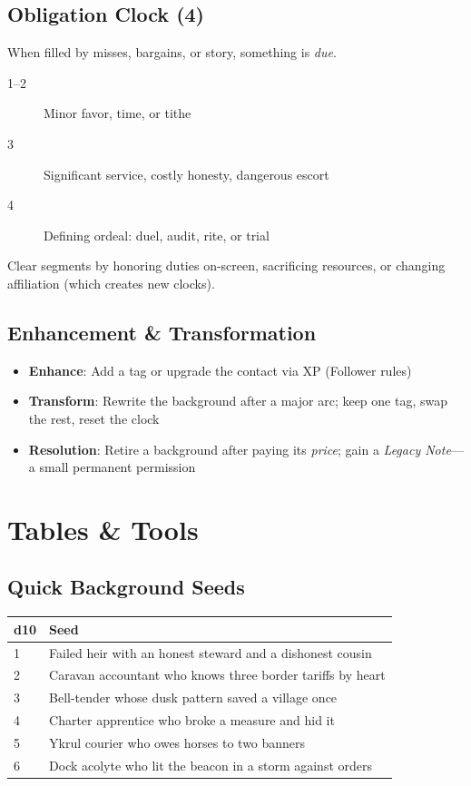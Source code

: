 \subsection*{Obligation Clock (4)}
When filled by misses, bargains, or story, something is \emph{due}.
\begin{description}
\item[1--2] Minor favor, time, or tithe
\item[3] Significant service, costly honesty, dangerous escort
\item[4] Defining ordeal: duel, audit, rite, or trial
\end{description}
Clear segments by honoring duties on-screen, sacrificing resources, or changing affiliation (which creates new clocks).

\subsection*{Enhancement \& Transformation}
\begin{itemize}
\item \textbf{Enhance}: Add a tag or upgrade the contact via XP (Follower rules)
\item \textbf{Transform}: Rewrite the background after a major arc; keep one tag, swap the rest, reset the clock
\item \textbf{Resolution}: Retire a background after paying its \emph{price}; gain a \emph{Legacy Note}—a small permanent permission
\end{itemize}

\section{Tables \& Tools}

\subsection*{Quick Background Seeds}
\small
\begin{longtable}{ll}
\toprule
d10 & Seed \\
\midrule
1 & Failed heir with an honest steward and a dishonest cousin \\
2 & Caravan accountant who knows three border tariffs by heart \\
3 & Bell-tender whose dusk pattern saved a village once \\
4 & Charter apprentice who broke a measure and hid it \\
5 & Ykrul courier who owes horses to two banners \\
6 & Dock acolyte who lit the beacon in a storm against orders \\
\bottomrule
\end{longtable}
\normalsize

